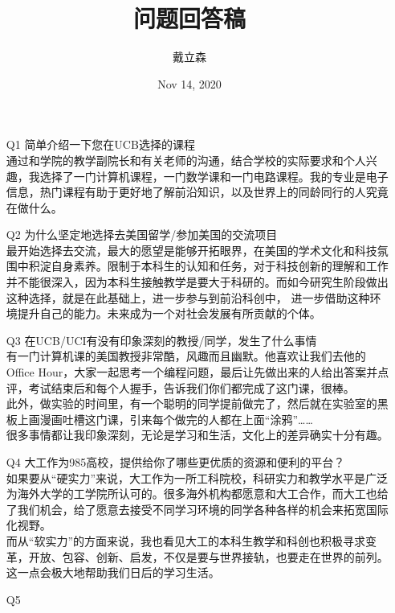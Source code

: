 \documentclass[10pt]{article}
\title{
    问题回答稿
}
\author{戴立森}
\date{Nov 14, 2020}
\begin{document}
    \maketitle
    \begin{itemize}
        \item [{\large Q1}]{
            {\large 简单介绍一下您在UCB选择的课程} \\
            通过和学院的教学副院长和有关老师的沟通，结合学校的实际要求和个人兴趣，我选择了一门计算机课程，一门数学课和一门电路课程。我的专业是电子信息，热门课程有助于更好地了解前沿知识，以及世界上的同龄同行的人究竟在做什么。
        }
        \item [{\large Q2}]{
            {\large 为什么坚定地选择去美国留学/参加美国的交流项目} \\
            最开始选择去交流，最大的愿望是能够开拓眼界，在美国的学术文化和科技氛围中积淀自身素养。限制于本科生的认知和任务，对于科技创新的理解和工作并不能很深入，因为本科生接触教学是要大于科研的。而如今研究生阶段做出这种选择，就是在此基础上，进一步参与到前沿科创中，
            进一步借助这种环境提升自己的能力。未来成为一个对社会发展有所贡献的个体。
            }
        \item [{\large Q3}]{
            {\large 在UCB/UCI有没有印象深刻的教授/同学，发生了什么事情} \\
            有一门计算机课的美国教授非常酷，风趣而且幽默。他喜欢让我们去他的Office Hour，大家一起思考一个编程问题，最后让先做出来的人给出答案并点评，考试结束后和每个人握手，告诉我们你们都完成了这门课，很棒。 \\
            此外，做实验的时间里，有一个聪明的同学提前做完了，然后就在实验室的黑板上画漫画吐槽这门课，引来每个做完的人都在上面“涂鸦”…… \\
            很多事情都让我印象深刻，无论是学习和生活，文化上的差异确实十分有趣。
            }
        \item [{\large Q4}]{
            {\large 大工作为985高校，提供给你了哪些更优质的资源和便利的平台？} \\
            如果要从“硬实力”来说，大工作为一所工科院校，科研实力和教学水平是广泛为海外大学的工学院所认可的。很多海外机构都愿意和大工合作，而大工也给了我们机会，给了愿意去接受不同学习环境的同学各种各样的机会来拓宽国际化视野。 \\
            而从“软实力”的方面来说，我也看见大工的本科生教学和科创也积极寻求变革，开放、包容、创新、启发，不仅是要与世界接轨，也要走在世界的前列。这一点会极大地帮助我们日后的学习生活。
            }
        \item [{\large Q5}]{
}
\end{itemize}
\end{document}
